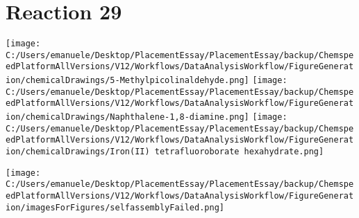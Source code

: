 \documentclass{article}%
\begin{document}
\section*{Reaction 29}%
%
\begin{scheme}[H]%
\begin{minipage}{0.5\textwidth}%
\texttt{[image: C:/Users/emanuele/Desktop/PlacementEssay/PlacementEssay/backup/ChemspeedPlatformAllVersions/V12/Workflows/DataAnalysisWorkflow/FigureGeneration/chemicalDrawings/5-Methylpicolinaldehyde.png]}%
\texttt{[image: C:/Users/emanuele/Desktop/PlacementEssay/PlacementEssay/backup/ChemspeedPlatformAllVersions/V12/Workflows/DataAnalysisWorkflow/FigureGeneration/chemicalDrawings/Naphthalene-1,8-diamine.png]}%
\texttt{[image: C:/Users/emanuele/Desktop/PlacementEssay/PlacementEssay/backup/ChemspeedPlatformAllVersions/V12/Workflows/DataAnalysisWorkflow/FigureGeneration/chemicalDrawings/Iron(II) tetrafluoroborate hexahydrate.png]}%
\end{minipage}%
\begin{minipage}{0.5\textwidth}%
\begin{center}%
\texttt{[image: C:/Users/emanuele/Desktop/PlacementEssay/PlacementEssay/backup/ChemspeedPlatformAllVersions/V12/Workflows/DataAnalysisWorkflow/FigureGeneration/imagesForFigures/selfassemblyFailed.png]}%
\end{center}%
\end{minipage}%
\caption{Self-assembly of components 3, 21, with Iron(II) in a 3.0:1.5:1.0 molar ratio in CH$_3$CN at 60\textdegree C for 40h. These are the reagents (starting materials) for reaction 29.}%
\end{scheme}%
\end{document}
